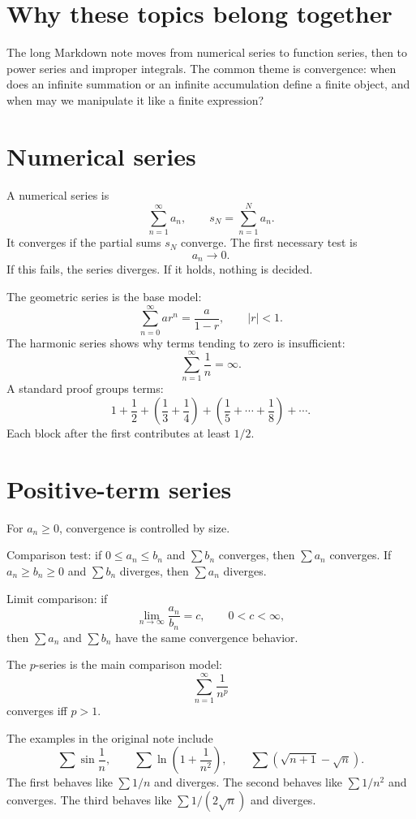
\section{Why these topics belong together}

The long Markdown note moves from numerical series to function series, then to power series and improper integrals.  The common theme is convergence: when does an infinite summation or an infinite accumulation define a finite object, and when may we manipulate it like a finite expression?

\section{Numerical series}

A numerical series is
\[
  \sum_{n=1}^{\infty}a_n,\qquad s_N=\sum_{n=1}^N a_n.
\]
It converges if the partial sums $s_N$ converge.  The first necessary test is
\[
  a_n\to0.
\]
If this fails, the series diverges.  If it holds, nothing is decided.

The geometric series is the base model:
\[
  \sum_{n=0}^{\infty} ar^n=\frac{a}{1-r},\qquad |r|<1.
\]
The harmonic series shows why terms tending to zero is insufficient:
\[
  \sum_{n=1}^{\infty}\frac1n=\infty.
\]
A standard proof groups terms:
\[
  1+\frac12+\left(\frac13+\frac14\right)+\left(\frac15+\cdots+\frac18\right)+\cdots.
\]
Each block after the first contributes at least $1/2$.

\section{Positive-term series}

For $a_n\ge0$, convergence is controlled by size.

Comparison test: if $0\le a_n\le b_n$ and $\sum b_n$ converges, then $\sum a_n$ converges.  If $a_n\ge b_n\ge0$ and $\sum b_n$ diverges, then $\sum a_n$ diverges.

Limit comparison: if
\[
  \lim_{n\to\infty}\frac{a_n}{b_n}=c,\qquad 0<c<\infty,
\]
then $\sum a_n$ and $\sum b_n$ have the same convergence behavior.

The $p$-series is the main comparison model:
\[
  \sum_{n=1}^{\infty}\frac1{n^p}
\]
converges iff $p>1$.

The examples in the original note include
\[
  \sum \sin\frac1n,\qquad
  \sum \ln\left(1+\frac1{n^2}\right),\qquad
  \sum \left(\sqrt{n+1}-\sqrt n\right).
\]
The first behaves like $\sum 1/n$ and diverges.  The second behaves like $\sum1/n^2$ and converges.  The third behaves like $\sum1/(2\sqrt n)$ and diverges.

